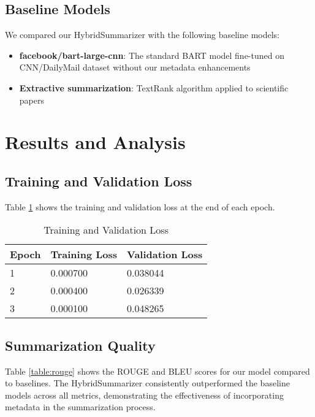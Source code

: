 \documentclass[conference]{IEEEtran}
\begin{document}
\subsection{Baseline Models}
We compared our HybridSummarizer with the following baseline models:

\begin{itemize}
\item \textbf{facebook/bart-large-cnn}: The standard BART model fine-tuned on CNN/DailyMail dataset without our metadata enhancements
\item \textbf{Extractive summarization}: TextRank algorithm applied to scientific papers
\end{itemize}

\section{Results and Analysis}

\subsection{Training and Validation Loss}

Table \ref{table:loss} shows the training and validation loss at the end of each epoch.

\begin{table}
\centering
\caption{Training and Validation Loss}
\label{table:loss}
\begin{tabularx}{\columnwidth}{lXX}
\toprule
\textbf{Epoch} & \textbf{Training Loss} & \textbf{Validation Loss} \\
\midrule
1 & 0.000700 & 0.038044 \\
2 & 0.000400 & 0.026339 \\
3 & 0.000100 & 0.048265 \\
\bottomrule
\end{tabularx}
\end{table}

\subsection{Summarization Quality}
Table \ref{table:rouge} shows the ROUGE and BLEU scores for our model compared to baselines. The HybridSummarizer consistently outperformed the baseline models across all metrics, demonstrating the effectiveness of incorporating metadata in the summarization process.
\end{document}
